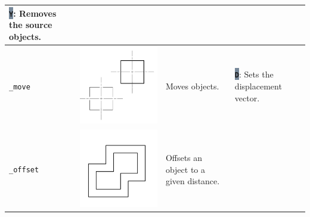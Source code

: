 \documentclass[..]{../IEEEphot}
\newcommand{\param}[1]{\colorbox{LightSlateGray}{\color{Navy}\texttt{\textbf{#1}}}}
\begin{document}
\begin{center}
\begin{longtable}{m{.2\linewidth}m{.2\linewidth}m{.25\linewidth}m{.25\linewidth}}
\param{Y}: Removes the source objects.
\\		
\midrule
\texttt{\_move} & \includegraphics[width = 0.8\linewidth, keepaspectratio]{../images/jpg/_move.jpg} & Moves objects. & 
\param{D}: Sets the displacement vector.
\\			
\midrule
\texttt{\_offset} & \includegraphics[width = 0.8\linewidth, keepaspectratio]{../images/jpg/_offset.jpg} & Offsets an object to a given distance.  & 
\\			
\midrule

\end{longtable}
\end{center}
\end{document}
